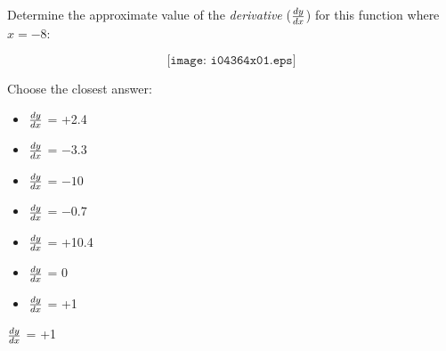 

Determine the approximate value of the {\it derivative} ($dy \over dx$) for this function where $x=-8$:

$$\texttt{[image: i04364x01.eps]}$$

Choose the closest answer:

\begin{itemize}
\item{} $dy \over dx$ = +2.4
\vskip 10pt 
\item{} $dy \over dx$ = $-3.3$
\vskip 10pt 
\item{} $dy \over dx$ = $-10$
\vskip 10pt 
\item{} $dy \over dx$ = $-0.7$
\vskip 10pt 
\item{} $dy \over dx$ = +10.4 
\vskip 10pt 
\item{} $dy \over dx$ = 0
\vskip 10pt 
\item{} $dy \over dx$ = +1
\end{itemize}







$dy \over dx$ = +1











